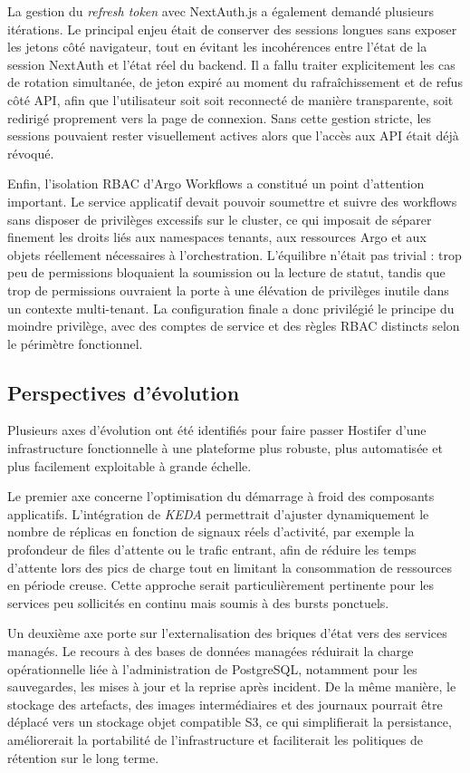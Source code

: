 La gestion du \textit{refresh token} avec NextAuth.js a également demandé plusieurs itérations. Le principal enjeu était de conserver des sessions longues sans exposer les jetons côté navigateur, tout en évitant les incohérences entre l'état de la session NextAuth et l'état réel du backend. Il a fallu traiter explicitement les cas de rotation simultanée, de jeton expiré au moment du rafraîchissement et de refus côté API, afin que l'utilisateur soit soit reconnecté de manière transparente, soit redirigé proprement vers la page de connexion. Sans cette gestion stricte, les sessions pouvaient rester visuellement actives alors que l'accès aux API était déjà révoqué.

Enfin, l'isolation RBAC d'Argo Workflows a constitué un point d'attention important. Le service applicatif devait pouvoir soumettre et suivre des workflows sans disposer de privilèges excessifs sur le cluster, ce qui imposait de séparer finement les droits liés aux namespaces tenants, aux ressources Argo et aux objets réellement nécessaires à l'orchestration. L'équilibre n'était pas trivial : trop peu de permissions bloquaient la soumission ou la lecture de statut, tandis que trop de permissions ouvraient la porte à une élévation de privilèges inutile dans un contexte multi-tenant. La configuration finale a donc privilégié le principe du moindre privilège, avec des comptes de service et des règles RBAC distincts selon le périmètre fonctionnel.

\subsection{Perspectives d'évolution}

Plusieurs axes d'évolution ont été identifiés pour faire passer Hostifer d'une infrastructure fonctionnelle à une plateforme plus robuste, plus automatisée et plus facilement exploitable à grande échelle.

Le premier axe concerne l'optimisation du démarrage à froid des composants applicatifs. L'intégration de \textit{KEDA} permettrait d'ajuster dynamiquement le nombre de réplicas en fonction de signaux réels d'activité, par exemple la profondeur de files d'attente ou le trafic entrant, afin de réduire les temps d'attente lors des pics de charge tout en limitant la consommation de ressources en période creuse. Cette approche serait particulièrement pertinente pour les services peu sollicités en continu mais soumis à des bursts ponctuels.

Un deuxième axe porte sur l'externalisation des briques d'état vers des services managés. Le recours à des bases de données managées réduirait la charge opérationnelle liée à l'administration de PostgreSQL, notamment pour les sauvegardes, les mises à jour et la reprise après incident. De la même manière, le stockage des artefacts, des images intermédiaires et des journaux pourrait être déplacé vers un stockage objet compatible S3, ce qui simplifierait la persistance, améliorerait la portabilité de l'infrastructure et faciliterait les politiques de rétention sur le long terme.

